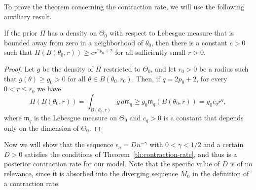 To prove the theorem concerning the contraction rate, we will use the following auxiliary result.

\begin{lemma}\label{lemma:th11-lemma-lebesgue}
  If the prior \(\Pi\) has a density on \(\Theta_0\) with respect to Lebesgue measure that is bounded away from zero in a neighborhood of \(\theta_0\), then there is a constant \(c>0\) such that \(\Pi(B(\theta_0, r))\geq cr^{2p_0+2}\) for all sufficiently small \(r>0\).
\end{lemma}
\begin{proof}
  Let \(g\) be the density of \(\Pi\) restricted to \(\Theta_0\), and let \(r_0>0\) be a radius such that \(g(\theta)\geq g_0>0\) for all \(\theta\in B(\theta_0, r_0)\). Then, if \(q=2p_0+2\), for every \(0<r\leq r_0\) we have
  \[
    \Pi(B(\theta_0, r)) =\int_{B(\theta_0, r)} g\, d\mathfrak{m}_q \geq g_0 \mathfrak{m}_q(B(\theta_0, r)) = g_0 c_q r^q,
  \]
  where \(\mathfrak{m}_q\) is the Lebesgue measure on \(\Theta_0\) and \(c_q>0\) is a constant that depends only on the dimension of \(\Theta_0\).
\end{proof}

Now we will show that the sequence \(\epsilon_n=Dn^{-\gamma}\) with \(0<\gamma<1/2\) and a certain \(D>0\) satisfies the conditions of Theorem~\ref{th:contraction-rate}, and thus is a posterior contraction rate for our model. Note that the specific value of \(D\) is of no relevance, since it is absorbed into the diverging sequence \(M_n\) in the definition of a contraction rate.

